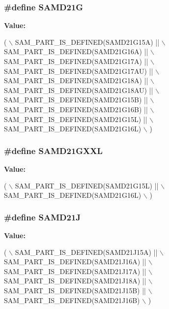 \subsubsection[{S\+A\+M\+D21\+G}]{\setlength{\rightskip}{0pt plus 5cm}\#define S\+A\+M\+D21\+G}\label{group__sam__part__macros__group_ga38b8f6ee1c68255f5fc157f564bb9db9}
{\bfseries Value\+:}
\begin{DoxyCode}
( \(\backslash\)
        SAM\_PART\_IS\_DEFINED(SAMD21G15A) || \(\backslash\)
        SAM\_PART\_IS\_DEFINED(SAMD21G16A) || \(\backslash\)
        SAM\_PART\_IS\_DEFINED(SAMD21G17A) || \(\backslash\)
        SAM\_PART\_IS\_DEFINED(SAMD21G17AU) || \(\backslash\)
        SAM\_PART\_IS\_DEFINED(SAMD21G18A) || \(\backslash\)
        SAM\_PART\_IS\_DEFINED(SAMD21G18AU) || \(\backslash\)
        SAM\_PART\_IS\_DEFINED(SAMD21G15B) || \(\backslash\)
        SAM\_PART\_IS\_DEFINED(SAMD21G16B) || \(\backslash\)
        SAM\_PART\_IS\_DEFINED(SAMD21G15L) || \(\backslash\)
        SAM\_PART\_IS\_DEFINED(SAMD21G16L) \(\backslash\)
    )
\end{DoxyCode}
\hypertarget{group__sam__part__macros__group_ga8166031d150c68969ecd40a7809aa146}{}
\subsubsection[{S\+A\+M\+D21\+G\+X\+X\+L}]{\setlength{\rightskip}{0pt plus 5cm}\#define S\+A\+M\+D21\+G\+X\+X\+L}\label{group__sam__part__macros__group_ga8166031d150c68969ecd40a7809aa146}
{\bfseries Value\+:}
\begin{DoxyCode}
( \(\backslash\)
        SAM\_PART\_IS\_DEFINED(SAMD21G15L) || \(\backslash\)
        SAM\_PART\_IS\_DEFINED(SAMD21G16L) \(\backslash\)
        )
\end{DoxyCode}
\hypertarget{group__sam__part__macros__group_ga55d9b92dcaef90e466055b1792d06d8a}{}
\subsubsection[{S\+A\+M\+D21\+J}]{\setlength{\rightskip}{0pt plus 5cm}\#define S\+A\+M\+D21\+J}\label{group__sam__part__macros__group_ga55d9b92dcaef90e466055b1792d06d8a}
{\bfseries Value\+:}
\begin{DoxyCode}
( \(\backslash\)
        SAM\_PART\_IS\_DEFINED(SAMD21J15A) || \(\backslash\)
        SAM\_PART\_IS\_DEFINED(SAMD21J16A) || \(\backslash\)
        SAM\_PART\_IS\_DEFINED(SAMD21J17A) || \(\backslash\)
        SAM\_PART\_IS\_DEFINED(SAMD21J18A) || \(\backslash\)
        SAM\_PART\_IS\_DEFINED(SAMD21J15B) || \(\backslash\)
        SAM\_PART\_IS\_DEFINED(SAMD21J16B) \(\backslash\)
    )
\end{DoxyCode}
\hypertarget{group__sam__part__macros__group_ga072dd622eab25246a14ce4a97a3df2df}{}
